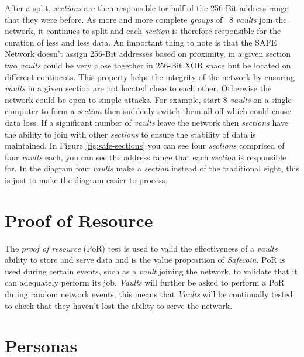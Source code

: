 After a split, \textit{sections} are then responsible for half of the 256-Bit address range that they were before. As more and more complete \textit{groups} of ~8 \textit{vaults} join the network, it continues to split and each \textit{section} is therefore responsible for the curation of less and less data. An important thing to note is that the SAFE Network doesn't assign 256-Bit addresses based on proximity, in a given section two \textit{vaults} could be very close together in 256-Bit XOR space but be located on different continents. This property helps the integrity of the network by ensuring \textit{vaults} in a given section are not located close to each other. Otherwise the network could be open to simple attacks. For example, start 8 \textit{vaults} on a single computer to form a \textit{section} then suddenly switch them all off which could cause data loss. If a significant number of \textit{vaults} leave the network then \textit{sections} have the ability to join with other \textit{sections} to ensure the stability of data is maintained. In Figure \ref{fig:safe-sections} you can see four \textit{sections} comprised of four \textit{vaults} each, you can see the address range that each \textit{section} is responsible for. In the diagram four \textit{vaults} make a \textit{section} instead of the traditional eight, this is just to make the diagram easier to process.

\section{Proof of Resource}
\label{subsec:proof-of-resource}

The \textit{proof of resource} (PoR) test is used to valid the effectiveness of a \textit{vaults} ability to store and serve data and is the value proposition of \textit{Safecoin}. PoR is used during certain events, such as a \textit{vault} joining the network, to validate that it can adequately perform its job. \textit{Vaults} will further be asked to perform a PoR during random network events, this means that \textit{Vaults} will be continually tested to check that they haven't lost the ability to serve the network.

\section{Personas}

